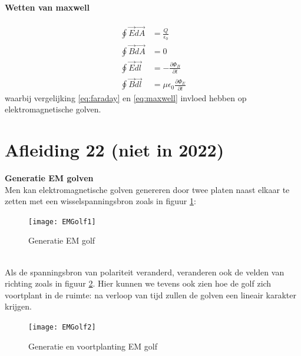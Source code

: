 \documentclass[a4paper,kul]{kulakarticle} %
\begin{document}
\paragraph{Wetten van maxwell}
\begin{align}
	\oint\vec{E}\vec{dA}&=\frac{Q}{\epsilon_0}\\
	\oint\vec{B}\vec{dA}&=0\\
	\label{eq:faraday}
	\oint\vec{E}\vec{dl}&=-\frac{\partial\Phi_B}{\partial t}\\
	\label{eq:maxwell}
	\oint\vec{B}\vec{dl}&=\mu\epsilon_0\frac{\partial\Phi_E}{\partial t}
\end{align}
waarbij vergelijking \ref{eq:faraday} en \ref{eq:maxwell} invloed hebben op elektromagnetische golven.
\newpage
\section{Afleiding 22 (niet in 2022)}
\textbf{Generatie EM golven}\\
Men kan elektromagnetische golven genereren door twee platen naast elkaar te zetten met een wisselspanningsbron zoals in figuur \ref{fig:emgolf1}:
\begin{figure}[h]
	\centering
	\texttt{[image: EMGolf1]}
	\caption[Generatie]{Generatie EM golf}
	\label{fig:emgolf1}
\end{figure}\\
Als de spanningsbron van polariteit veranderd, veranderen ook de velden van richting zoals in figuur \ref{fig:emgolf2}. Hier kunnen we tevens ook zien hoe de golf zich voortplant in de ruimte: na verloop van tijd zullen de golven een lineair karakter krijgen. 
\begin{figure}[h]
	\centering
	\texttt{[image: EMGolf2]}
	\caption[Generatie en voortplanting]{Generatie en voortplanting EM golf}
	\label{fig:emgolf2}
\end{figure}
\newpage
\end{document}
